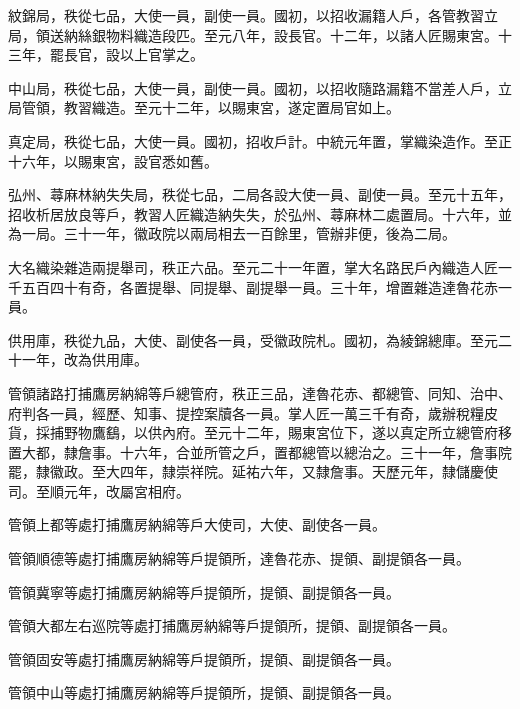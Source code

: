 \begin{pinyinscope}
 紋錦局，秩從七品，大使一員，副使一員。國初，以招收漏籍人戶，各管教習立局，領送納絲銀物料織造段匹。至元八年，設長官。十二年，以諸人匠賜東宮。十三年，罷長官，設以上官掌之。



 中山局，秩從七品，大使一員，副使一員。國初，以招收隨路漏籍不當差人戶，立局管領，教習織造。至元十二年，以賜東宮，遂定置局官如上。



 真定局，秩從七品，大使一員。國初，招收戶計。中統元年置，掌織染造作。至正十六年，以賜東宮，設官悉如舊。



 弘州、蕁麻林納失失局，秩從七品，二局各設大使一員、副使一員。至元十五年，招收析居放良等戶，教習人匠織造納失失，於弘州、蕁麻林二處置局。十六年，並為一局。三十一年，徽政院以兩局相去一百餘里，管辦非便，後為二局。



 大名織染雜造兩提舉司，秩正六品。至元二十一年置，掌大名路民戶內織造人匠一千五百四十有奇，各置提舉、同提舉、副提舉一員。三十年，增置雜造達魯花赤一員。



 供用庫，秩從九品，大使、副使各一員，受徽政院札。國初，為綾錦總庫。至元二十一年，改為供用庫。



 管領諸路打捕鷹房納綿等戶總管府，秩正三品，達魯花赤、都總管、同知、治中、府判各一員，經歷、知事、提控案牘各一員。掌人匠一萬三千有奇，歲辦稅糧皮貨，採捕野物鷹鷂，以供內府。至元十二年，賜東宮位下，遂以真定所立總管府移置大都，隸詹事。十六年，合並所管之戶，置都總管以總治之。三十一年，詹事院罷，隸徽政。至大四年，隸崇祥院。延祐六年，又隸詹事。天歷元年，隸儲慶使司。至順元年，改屬宮相府。



 管領上都等處打捕鷹房納綿等戶大使司，大使、副使各一員。



 管領順德等處打捕鷹房納綿等戶提領所，達魯花赤、提領、副提領各一員。



 管領冀寧等處打捕鷹房納綿等戶提領所，提領、副提領各一員。



 管領大都左右巡院等處打捕鷹房納綿等戶提領所，提領、副提領各一員。



 管領固安等處打捕鷹房納綿等戶提領所，提領、副提領各一員。



 管領中山等處打捕鷹房納綿等戶提領所，提領、副提領各一員。




\end{pinyinscope}

